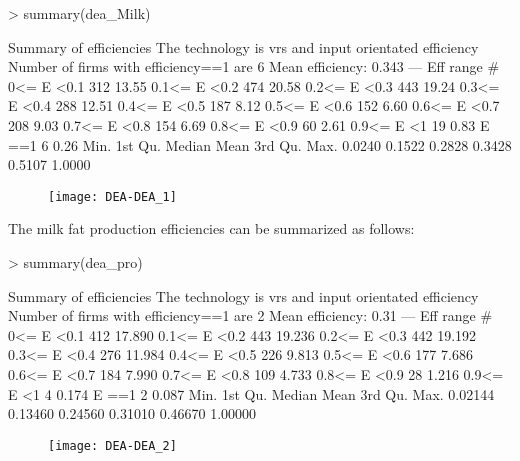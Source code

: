 \documentclass[12pt,]{article}
\begin{document}
\begin{Schunk}
\begin{Sinput}
> summary(dea_Milk)
\end{Sinput}
\begin{Soutput}
Summary of efficiencies
The technology is vrs and input orientated efficiency
Number of firms with efficiency==1 are 6 
Mean efficiency: 0.343 
---                
  Eff range        #     %
  0<= E <0.1     312 13.55
  0.1<= E <0.2   474 20.58
  0.2<= E <0.3   443 19.24
  0.3<= E <0.4   288 12.51
  0.4<= E <0.5   187  8.12
  0.5<= E <0.6   152  6.60
  0.6<= E <0.7   208  9.03
  0.7<= E <0.8   154  6.69
  0.8<= E <0.9    60  2.61
  0.9<= E <1      19  0.83
        E ==1      6  0.26
   Min. 1st Qu.  Median    Mean 3rd Qu.    Max. 
 0.0240  0.1522  0.2828  0.3428  0.5107  1.0000 
\end{Soutput}
\end{Schunk}

\begin{figure}[h]
\texttt{[image: DEA-DEA\_1]}
\end{figure}



The milk fat production efficiencies can be summarized as follows:
\begin{Schunk}
\begin{Sinput}
> summary(dea_pro)
\end{Sinput}
\begin{Soutput}
Summary of efficiencies
The technology is vrs and input orientated efficiency
Number of firms with efficiency==1 are 2 
Mean efficiency: 0.31 
---                
  Eff range        #      %
  0<= E <0.1     412 17.890
  0.1<= E <0.2   443 19.236
  0.2<= E <0.3   442 19.192
  0.3<= E <0.4   276 11.984
  0.4<= E <0.5   226  9.813
  0.5<= E <0.6   177  7.686
  0.6<= E <0.7   184  7.990
  0.7<= E <0.8   109  4.733
  0.8<= E <0.9    28  1.216
  0.9<= E <1       4  0.174
        E ==1      2  0.087
   Min. 1st Qu.  Median    Mean 3rd Qu.    Max. 
0.02144 0.13460 0.24560 0.31010 0.46670 1.00000 
\end{Soutput}
\end{Schunk}

\begin{figure}[h]
\texttt{[image: DEA-DEA\_2]}
\end{figure}
\end{document}
